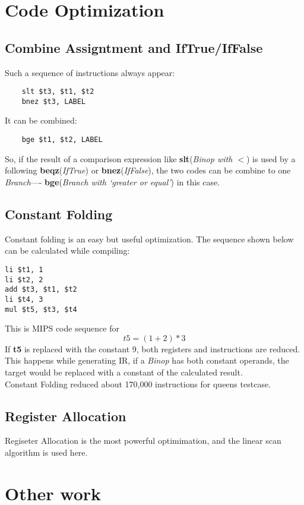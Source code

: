 \documentclass[nocopyrightspace]{sigplanconf}
\begin{document}
\section{Code Optimization}
\subsection{Combine Assigntment and IfTrue/IfFalse}
Such a sequence of instructions always appear:
\lstset{language=[mips]Assembler}
\begin{lstlisting}
    slt $t3, $t1, $t2
    bnez $t3, LABEL
\end{lstlisting}
It can be combined:
\begin{lstlisting}
    bge $t1, $t2, LABEL
\end{lstlisting}
So, if the result of a comparison expression like \textbf{slt}(\textsl{Binop with $<$})  is used by a following  \textbf{beqz}(\textsl{IfTrue}) or \textbf{bnez}(\textsl{IfFalse}), the two codes can be combine to one \textsl{Branch}---- \textbf{bge}(\textsl{Branch with `greater or equal'}) in this case.

\subsection{Constant Folding}
Constant folding is an easy but useful optimization. The sequence shown below can be calculated while compiling:
\begin{lstlisting}
li $t1, 1
li $t2, 2
add $t3, $t1, $t2
li $t4, 3
mul $t5, $t3, $t4
\end{lstlisting}
This is MIPS code sequence for
$$t5 = (1+2)*3$$
If \textbf{t5} is replaced with the constant 9, both registers and instructions are reduced.\\
This happens while generating IR, if a \textsl{Binop} has both constant operands, the target would be replaced with a constant of the calculated result.\\
Constant Folding reduced about 170,000 instructions for queens testcase.

\subsection{Register Allocation}
Regiseter Allocation is the most powerful optimimation, and the linear scan algorithm is used here.

\section{Other work}
\end{document}

